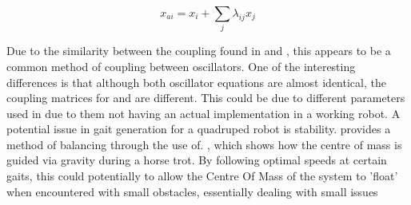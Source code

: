 \begin{equation}
x_{ai} = x_{i} + \sum_{j}{\lambda_{ij}x_{j}}
\label{vanderpol:coupling}
\end{equation}

Due to the similarity between the coupling found in \cite{Collins1994} and \cite{Liu2009}, this appears to be a common method of coupling between oscillators. One of the interesting differences is that although both oscillator equations are almost identical, the coupling matrices for \cite{Collins1994} and \cite{Liu2009} are different. This could be due to different parameters used in \cite{Collins1994} due to them not having an actual implementation in a working robot.
A potential issue in gait generation for a quadruped robot is stability. \cite{Meng2015} provides a method of balancing through the use of.  \cite{PrescottTonyJLeporaNathanFVerschure2018}, which shows how the centre of mass is guided via gravity during a horse trot. By following optimal speeds at certain gaits, this could potentially to allow the Centre Of Mass of the system to 'float' when encountered with small obstacles, essentially dealing with small issues










